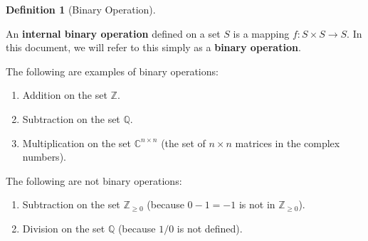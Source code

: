 \documentclass{scrartcl}
\theoremstyle{definition}
\newtheorem{definition}{Definition}[section]
\theoremstyle{plain}
\theoremstyle{remark}
\begin{document}
\begin{definition}[Binary Operation]
    \label{def:binary operation}

    \newcommand{\C}{\mathbb{C}}
    \newcommand{\Q}{\mathbb{Q}}
    \newcommand{\Z}{\mathbb{Z}}

    An \textbf{internal binary operation} defined on a set $S$ is a mapping $f:S\times S\to S$.
    In this document, we will refer to this simply as a \textbf{binary operation}.

    The following are examples of binary operations:
    \begin{enumerate}
        \item Addition on the set $\Z$.
        \item Subtraction on the set $\Q$.
        \item Multiplication on the set $\C^{n\times n}$ (the set of $n\times n$ matrices in the complex numbers).
    \end{enumerate}

    The following are not binary operations:
    \begin{enumerate}
        \item Subtraction on the set $\Z_{\geq 0}$ (because $0-1=-1$ is not in $\Z_{\geq 0}$).
        \item Division on the set $\Q$ (because $1/0$ is not defined).
    \end{enumerate}
\end{definition}
\end{document}
